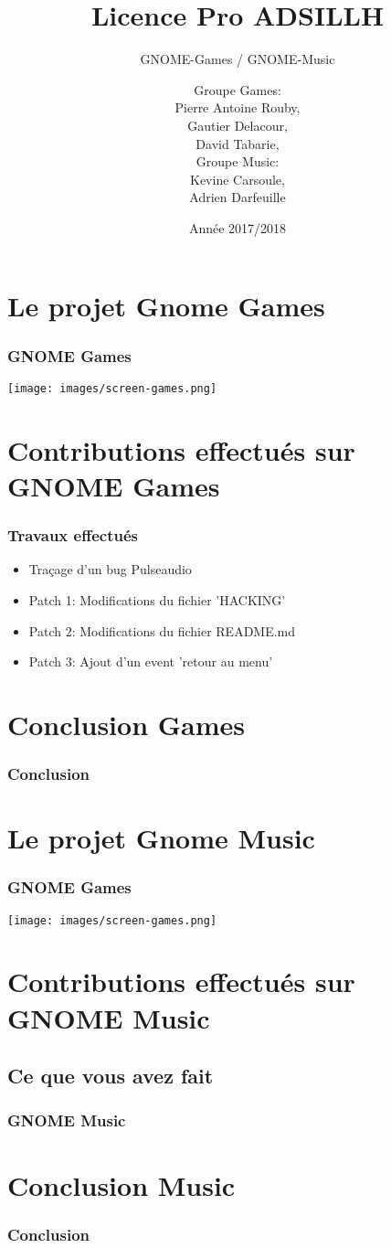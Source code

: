 \documentclass{beamer}
\title{Licence Pro ADSILLH}
\subtitle{GNOME-Games / GNOME-Music}
\author{Groupe Games:\\ Pierre Antoine Rouby,\\ Gautier Delacour,\\
  David Tabarie,\\
  \vspace{0.8cm}
  Groupe Music:\\ Kevine Carsoule,\\ Adrien Darfeuille}
\date{Année 2017/2018}
\begin{document}
\frame{\titlepage}

\section{Le projet Gnome Games}
\begin{frame}
  \frametitle{GNOME Games}
  \texttt{[image: images/screen-games.png]}
\end{frame}

\section{Contributions effectués sur GNOME Games}
\begin{frame}
  \frametitle{Travaux effectués}
  \begin{itemize}
    \item Traçage d'un bug Pulseaudio
    \item Patch 1: Modifications du fichier 'HACKING'
    \item Patch 2: Modifications du fichier README.md
    \item Patch 3: Ajout d'un event 'retour au menu'
  \end{itemize}
\end{frame}

\section{Conclusion Games}
\begin{frame}
  \frametitle{Conclusion}
\end{frame}

\section{Le projet Gnome Music}
\begin{frame}
  \frametitle{GNOME Games}
  \texttt{[image: images/screen-games.png]}
\end{frame}

\section{Contributions effectués sur GNOME Music}
\subsection{Ce que vous avez fait}
\begin{frame}
  \frametitle{}
\end{frame}

\begin{frame}
  \frametitle{GNOME Music}
\end{frame}

\section{Conclusion Music}
\begin{frame}
  \frametitle{Conclusion}
\end{frame}
\end{document}
